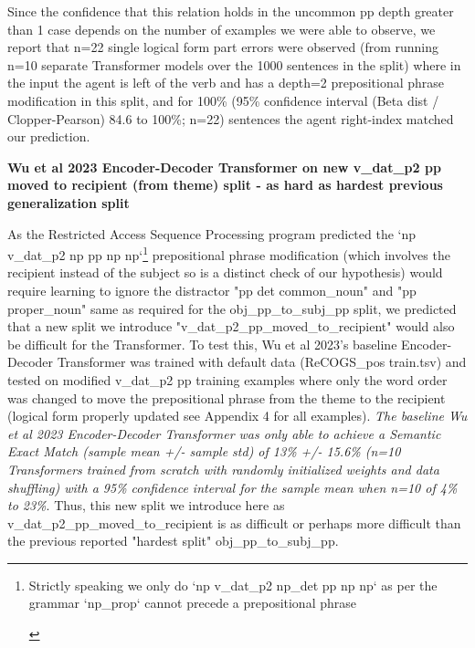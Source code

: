 \documentclass[11pt]{article}
\begin{document}
Since the confidence that this relation holds in the uncommon pp depth greater than 1 case depends on the number of examples we were able to observe, we report that n=22 single logical form part errors were observed (from running n=10 separate Transformer models over the 1000 sentences in the split) where in the input the agent is left of the verb and has a depth=2 prepositional phrase modification in this split, and for 100\% (95\% confidence interval (Beta dist / Clopper-Pearson) 84.6 to 100\%; n=22) sentences the agent right-index matched our prediction.

\textbf{Wu et al 2023 Encoder-Decoder Transformer on new v\_dat\_p2 pp moved to recipient (from theme) split - as hard as hardest previous generalization split}

As the Restricted Access Sequence Processing program predicted the `np v\_dat\_p2 np pp np np`\footnote{
\begin{tiny}
Strictly speaking we only do `np v\_dat\_p2 np\_det pp np np` as per the grammar `np\_prop` cannot precede a prepositional phrase
\end{tiny}
} prepositional phrase modification (which involves the recipient instead of the subject so is a distinct check of our hypothesis) would require learning to ignore the distractor "pp det common\_noun" and "pp proper\_noun" same as required for the obj\_pp\_to\_subj\_pp split, we predicted that a new split we introduce "v\_dat\_p2\_pp\_moved\_to\_recipient" would also be difficult for the Transformer. To test this, Wu et al 2023's baseline Encoder-Decoder Transformer was trained with default data (ReCOGS\_pos train.tsv) and tested on modified v\_dat\_p2 pp training examples where only the word order was changed to move the prepositional phrase from the theme to the recipient (logical form properly updated see Appendix 4 for all examples). \textit{The baseline Wu et al 2023 Encoder-Decoder Transformer was only able to achieve a Semantic Exact Match (sample mean +/- sample std) of 13\% +/- 15.6\% (n=10 Transformers trained from scratch with randomly initialized weights and data shuffling) with a 95\% confidence interval for the sample mean when n=10 of 4\% to 23\%}. Thus, this new split we introduce here as v\_dat\_p2\_pp\_moved\_to\_recipient is as difficult or perhaps more difficult than the previous reported "hardest split" obj\_pp\_to\_subj\_pp.

\end{document}
